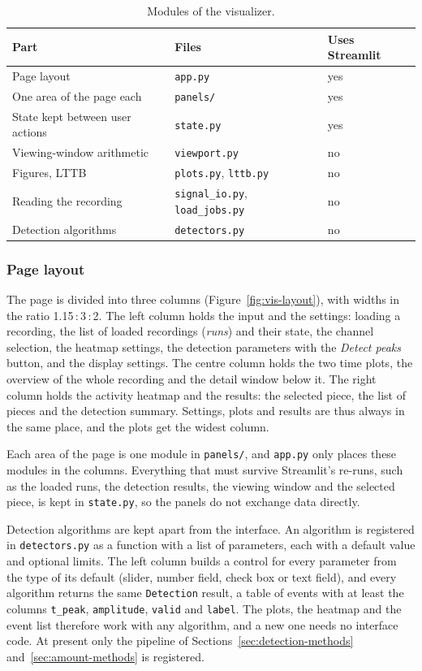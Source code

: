 \begin{table}[H]
  \centering
  \caption{Modules of the visualizer.}
  \label{tab:vis-modules}
  \begin{tabular}{lll}
    \toprule
    Part & Files & Uses Streamlit \\
    \midrule
    Page layout & \texttt{app.py} & yes \\
    One area of the page each & \texttt{panels/} & yes \\
    State kept between user actions & \texttt{state.py} & yes \\
    Viewing-window arithmetic & \texttt{viewport.py} & no \\
    Figures, LTTB & \texttt{plots.py}, \texttt{lttb.py} & no \\
    Reading the recording & \texttt{signal\_io.py}, \texttt{load\_jobs.py} & no \\
    Detection algorithms & \texttt{detectors.py} & no \\
    \bottomrule
  \end{tabular}
\end{table}

\subsubsection{Page layout}
\label{sec:vis-layout}
The page is divided into three columns (Figure~\ref{fig:vis-layout}), with widths in the
ratio 1.15\,:\,3\,:\,2. The left column holds the input and the settings: loading a
recording, the list of loaded recordings (\emph{runs}) and their state, the channel
selection, the heatmap settings, the detection parameters with the \emph{Detect peaks}
button, and the display settings. The centre column holds the two time plots, the
overview of the whole recording and the detail window below it. The right column holds
the activity heatmap and the results: the selected piece, the list of pieces and the
detection summary. Settings, plots and results are thus always in the same place, and
the plots get the widest column.

Each area of the page is one module in \texttt{panels/}, and \texttt{app.py} only places
these modules in the columns. Everything that must survive Streamlit's re-runs, such as
the loaded runs, the detection results, the viewing window and the selected piece, is
kept in \texttt{state.py}, so the panels do not exchange data directly.

Detection algorithms are kept apart from the interface. An algorithm is registered in
\texttt{detectors.py} as a function with a list of parameters, each with a default value
and optional limits. The left column builds a control for every parameter from the type
of its default (slider, number field, check box or text field), and every algorithm
returns the same \texttt{Detection} result, a table of events with at least the columns
\texttt{t\_peak}, \texttt{amplitude}, \texttt{valid} and \texttt{label}. The plots, the
heatmap and the event list therefore work with any algorithm, and a new one needs no
interface code. At present only the pipeline of Sections~\ref{sec:detection-methods}
and~\ref{sec:amount-methods} is registered.

